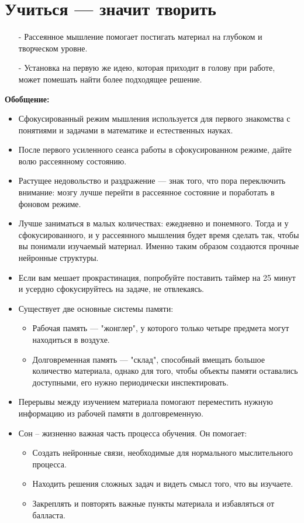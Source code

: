 \documentclass{article}
\begin{document}
\section{Учиться --- значит творить}
\begin{itemize}
\item[-] Рассеянное мышление помогает постигать материал на глубоком и творческом уровне.
\item[-] Установка на первую же идею, которая приходит в голову при работе, может помешать найти более подходящее решение.
\end{itemize}
\textbf{Обобщение:}
\begin{itemize}
\item Сфокусированный режим мышления используется для первого знакомства с понятиями и задачами в математике и естественных науках.
\item После первого усиленного сеанса работы в сфокусированном режиме, дайте волю рассеянному состоянию.
\item Растущее недовольство и раздражение --- знак того, что пора переключить внимание: мозгу лучше перейти в рассеянное состояние и поработать в фоновом режиме.
\item Лучше заниматься в малых количествах: ежедневно и понемного. Тогда и у сфокусированного, и у рассеянного мышления будет время сделать так, чтобы вы понимали изучаемый материал. Именно таким образом создаются прочные нейронные структуры.
\item Если вам мешает прокрастинация, попробуйте поставить таймер на 25 минут и усердно сфокусируйтесь на задаче, не отвлекаясь.
\item Существует две основные системы памяти:
\begin{itemize}
\item Рабочая память --- "жонглер", у которого только четыре предмета могут находиться в воздухе.
\item Долговременная память --- "склад", способный вмещать большое количество материала, однако для того, чтобы объекты памяти оставались доступными, его нужно периодически инспектировать.
\end{itemize}
\item Перерывы между изучением материала помогают переместить нужную информацию из рабочей памяти в долговременную.
\item Сон -- жизненно важная часть процесса обучения. Он помогает:
\begin{itemize}
\item Создать нейронные связи, необходимые для нормального мыслительного процесса.
\item Находить решения сложных задач и видеть смысл того, что вы изучаете.
\item Закреплять и повторять важные пункты материала и избавляться от балласта.
\end{itemize}
\end{itemize}
\end{document}
